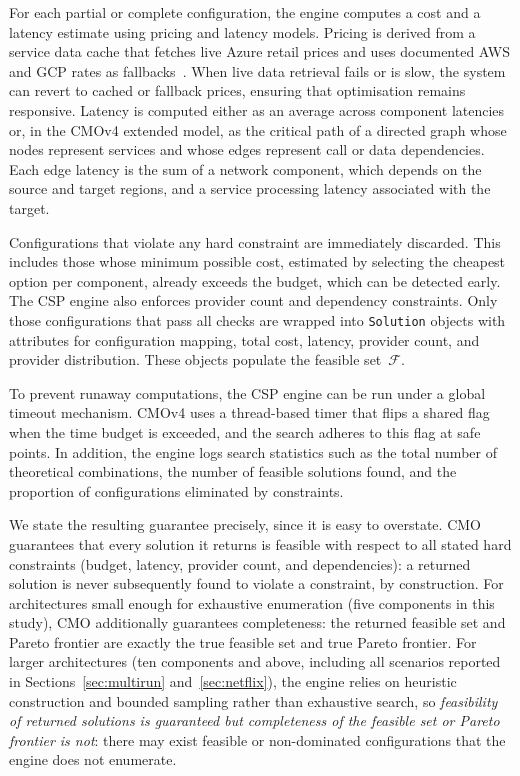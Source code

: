 \documentclass[journal]{IEEEtran}
\newcommand{\cmo}{CMO\xspace}
\newcommand{\cmofour}{CMOv4\xspace}
\begin{document}
For each partial or complete configuration, the engine computes a cost and a
latency estimate using pricing and latency models. Pricing is derived from a
service data cache that fetches live Azure retail prices and uses documented AWS
and GCP rates as fallbacks~\cite{azure_prices,aws_pricing,gcp_pricing}. When
live data retrieval fails or is slow, the system can revert to cached or
fallback prices, ensuring that optimisation remains responsive. Latency is
computed either as an average across component latencies or, in the \cmofour
extended model, as the critical path of a directed graph whose nodes represent
services and whose edges represent call or data dependencies. Each edge latency
is the sum of a network component, which depends on the source and target
regions, and a service processing latency associated with the target.

Configurations that violate any hard constraint are immediately discarded. This
includes those whose minimum possible cost, estimated by selecting the cheapest
option per component, already exceeds the budget, which can be detected early.
The CSP engine also enforces provider count and dependency constraints. Only
those configurations that pass all checks are wrapped into \texttt{Solution}
objects with attributes for configuration mapping, total cost, latency, provider
count, and provider distribution. These objects populate the feasible
set~$\mathcal{F}$.

To prevent runaway computations, the CSP engine can be run under a global
timeout mechanism. \cmofour uses a thread-based timer that flips a shared flag
when the time budget is exceeded, and the search adheres to this flag at safe
points. In addition, the engine logs search statistics such as the total number
of theoretical combinations, the number of feasible solutions found, and the
proportion of configurations eliminated by constraints.

We state the resulting guarantee precisely, since it is easy to overstate.
\cmo guarantees that every solution it returns is feasible with respect to
all stated hard constraints (budget, latency, provider count, and
dependencies): a returned solution is never subsequently found to violate a
constraint, by construction. For architectures small enough for exhaustive
enumeration (five components in this study), \cmo additionally guarantees
completeness: the returned feasible set and Pareto frontier are exactly
the true feasible set and true Pareto frontier. For larger architectures
(ten components and above, including all scenarios reported in
Sections~\ref{sec:multirun} and~\ref{sec:netflix}), the engine relies on
heuristic construction and bounded sampling rather than exhaustive search, so
\emph{feasibility of returned solutions is guaranteed but completeness of the
feasible set or Pareto frontier is not}: there may exist feasible or
non-dominated configurations that the engine does not enumerate.
\end{document}
